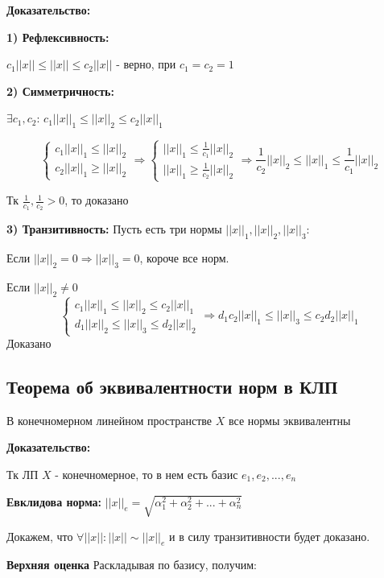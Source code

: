 \documentclass[12pt, english]{article}
\begin{document}
\textbf{Доказательство:}

	\textbf{1) Рефлексивность:}
		
		$c_1||x|| \leq ||x|| \leq c_2||x||$ - верно, при $c_1 = c_2 = 1$
		
	\textbf{2)	Симметричность:}
	
		 $\exists c_1, c_2$:
		$c_1||x||_1 \leq ||x||_2 \leq c_2||x||_1$
	
$$
\begin{cases}
   c_1||x||_1 \leq ||x||_2 \\
   c_2||x||_1  \ge ||x||_2  
\end{cases}
\Rightarrow
\begin{cases}
   ||x||_1 \leq \frac{1}{c_1}||x||_2 \\
   ||x||_1  \ge \frac{1}{c_2}||x||_2  
   
\end{cases}
\Rightarrow
\frac{1}{c_2}||x||_2 \leq ||x||_1 \leq \frac{1}{c_1}||x||_2
$$

Тк $\frac{1}{c_1} , \frac{1}{c_2} > 0$, то доказано

			
	\textbf{3)	Транзитивность:}
	Пусть есть три нормы $||x||_1 , ||x||_2 , ||x||_3$:
	
	Если $||x||_2 = 0 \Rightarrow ||x||_3 = 0$, короче все норм.
	
	Если $||x||_2 \neq 0 $
		$$
\begin{cases}
	c_1||x||_1 \leq ||x||_2 \leq c_2||x||_1 \\
	d_1||x||_2 \leq ||x||_3 \leq d_2||x||_2
\end{cases}
\Rightarrow
	d_1 c_2 ||x||_1 \leq ||x||_3  \leq c_2 d_2||x||_1
$$
		Доказано
		
\subsection{Теорема об эквивалентности норм в КЛП}
	В конечномерном линейном пространстве $X$ все нормы эквивалентны
	
\textbf{Доказательство:}
	
	Тк ЛП $X$ - конечномерное, то в нем есть базис $e_1 , e_2, ..., e_n$
		
	\textbf{Евклидова норма:} $||x||_e = \sqrt{\alpha_1^2 + \alpha_2^2 + ... +\alpha_n^2  }$
	
	Докажем, что $\forall ||x|| : ||x|| \sim ||x||_e$ и в силу транзитивности будет доказано.
	
\textbf{	Верхняя оценка}
	Раскладывая по базису, получим:
	
\end{document}
